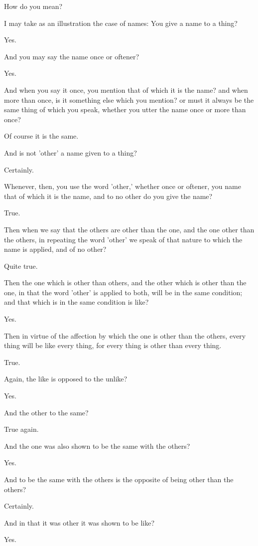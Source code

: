 How do you mean?

I may take as an illustration the case of names: You give a name to a
thing?

Yes.

And you may say the name once or oftener?

Yes.

And when you say it once, you mention that of which it is the name? and
when more than once, is it something else which you mention? or must it
always be the same thing of which you speak, whether you utter the name
once or more than once?

Of course it is the same.

And is not 'other' a name given to a thing?

Certainly.

Whenever, then, you use the word 'other,' whether once or oftener, you
name that of which it is the name, and to no other do you give the name?

True.

Then when we say that the others are other than the one, and the one
other than the others, in repeating the word 'other' we speak of that
nature to which the name is applied, and of no other?

Quite true.

Then the one which is other than others, and the other which is other
than the one, in that the word 'other' is applied to both, will be in
the same condition; and that which is in the same condition is like?

Yes.

Then in virtue of the affection by which the one is other than the
others, every thing will be like every thing, for every thing is other
than every thing.

True.

Again, the like is opposed to the unlike?

Yes.

And the other to the same?

True again.

And the one was also shown to be the same with the others?

Yes.

And to be the same with the others is the opposite of being other than
the others?

Certainly.

And in that it was other it was shown to be like?

Yes.

